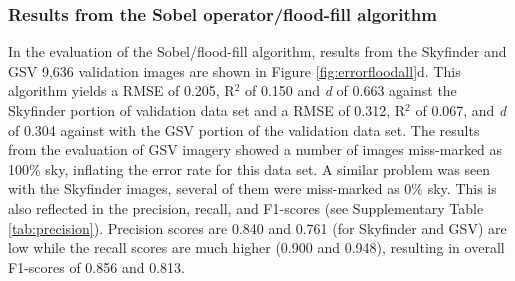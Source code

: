 \documentclass[final,3p,times,authoryear]{elsarticle}
\begin{document}
\subsubsection{Results from the \cite{Middel2018} Sobel operator/flood-fill algorithm}\label{sec:resultsflood}
In the evaluation of the Sobel/flood-fill algorithm, results from the Skyfinder and GSV 9,636 validation images are shown in Figure \ref{fig:errorfloodall}d. This algorithm yields a RMSE of 0.205, R$^{2}$ of 0.150 and \textit{d} of 0.663 against the Skyfinder portion of validation data set and a RMSE of 0.312, R$^{2}$ of 0.067, and \textit{d} of 0.304 against with the GSV portion of the validation data set. The results from the evaluation of GSV imagery showed a number of images miss-marked as 100\% sky, inflating the error rate for this data set. A similar problem was seen with the Skyfinder images, several of them were miss-marked as 0\% sky. This is also reflected in the precision, recall, and F1-scores (see Supplementary Table \ref{tab:precision}). Precision scores are 0.840 and 0.761 (for Skyfinder and GSV) are low while the recall scores are much higher (0.900 and 0.948), resulting in overall F1-scores of 0.856 and 0.813. 




\end{document}
